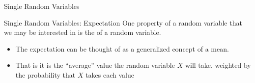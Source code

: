 \documentclass[notheorems,9pt, handout]{beamer}
\begin{document}
\begin{frame}{Single Random Variables} 
	\centering{}	
\end{frame}
\begin{frame}{Single Random Variables: Expectation} 
	\label{frame:srv-mean}
	One property of a random variable that we may be interested in is the  of a random variable. 
	\begin{itemize}
		\item The expectation can be thought of as a generalized concept of a mean.
		\item That is it is the ``average'' value the random variable \(X\) will take, weighted by the probability that \(X\) takes each value
	\end{itemize}
\end{frame}
\end{document}
